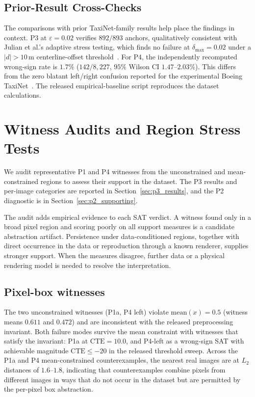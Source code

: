 \documentclass[twocolumn,smallextended,runningheads]{svjour3}
\begin{document}
\subsection{Prior-Result Cross-Checks}
\label{sec:prior_cross_checks}

The comparisons with prior TaxiNet-family results help place the findings in context. P3 at $\varepsilon{=}0.02$ verifies $892/893$ anchors, qualitatively consistent with Julian et al.'s adaptive stress testing, which finds no failure at $\delta_\text{max}{=}0.02$ under a $|d|{>}10$\,m centerline-offset threshold~\cite{julian2020}. For P4, the independently recomputed wrong-sign rate is $1.7\%$ ($142/8{,}227$, $95\%$ Wilson CI $1.47$--$2.03\%$). This differs from the zero blatant left/right confusion reported for the experimental Boeing TaxiNet~\cite{pasareanu2023closedloop}. The released empirical-baseline script reproduces the dataset calculations.

\section{Witness Audits and Region Stress Tests}

We audit representative P1 and P4 witnesses from the unconstrained and mean-constrained regions to assess their support in the dataset. The P3 results and per-image categories are reported in Section~\ref{sec:p3_results}, and the P2 diagnostic is in Section~\ref{sec:p2_supporting}.

The audit adds empirical evidence to each SAT verdict. A witness found only in a broad pixel region and scoring poorly on all support measures is a candidate abstraction artifact. Persistence under data-conditioned regions, together with direct occurrence in the data or reproduction through a known renderer, supplies stronger support. When the measures disagree, further data or a physical rendering model is needed to resolve the interpretation.

\subsection{Pixel-box witnesses}
\label{sec:box_coverage}
\label{sec:plausibility_constrained}

The two unconstrained witnesses (P1a, P4 left) violate $\text{mean}(x) = 0.5$ (witness means $0.611$ and $0.472$) and are inconsistent with the released preprocessing invariant. Both failure modes survive the mean constraint with witnesses that satisfy the invariant: P1a at $\text{CTE}{=}10.0$, and P4-left as a wrong-sign SAT with achievable magnitude $\text{CTE}\le-20$ in the released threshold sweep. Across the P1a and P4 mean-constrained counterexamples, the nearest real images are at $L_2$ distances of $1.6$--$1.8$, indicating that counterexamples combine pixels from different images in ways that do not occur in the dataset but are permitted by the per-pixel box abstraction.
\end{document}
